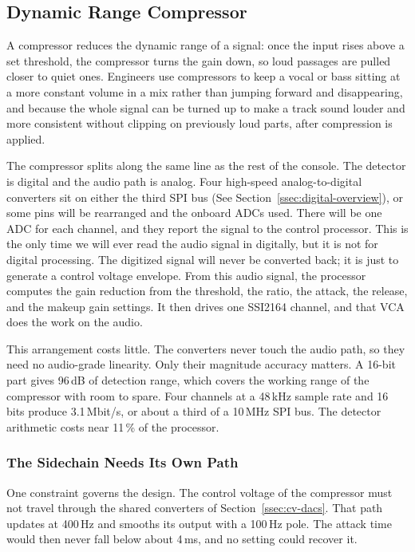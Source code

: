 \documentclass[11pt, letterpaper,titlepage]{article}
\begin{document}
\subsection{Dynamic Range Compressor}
\label{ssec:compressor}

A compressor reduces the dynamic range of a signal: once the input rises above a set threshold, the compressor turns the gain down, so loud passages are pulled closer to quiet ones. Engineers use compressors to keep a vocal or bass sitting at a more constant volume in a mix rather than jumping forward and disappearing, and because the whole signal can be turned up to make a track sound louder and more consistent without clipping on previously loud parts, after compression is applied.

The compressor splits along the same line as the rest of the console. The
detector is digital and the audio path is analog. Four high-speed
analog-to-digital converters sit on either the third SPI bus (See Section~\ref{ssec:digital-overview}), or some pins will be rearranged and the onboard ADCs used. There will be one ADC for each channel, and
they report the signal to the control processor. This is the only time we will ever read the audio signal in digitally, but it is not for digital processing. The digitized signal will never be converted back; it is just to generate a control voltage envelope. From this audio signal, the processor computes the
gain reduction from the threshold, the ratio, the attack, the release, and the
makeup gain settings. It then drives one SSI2164 channel, and that VCA does the work on
the audio.

This arrangement costs little. The converters never touch the audio path, so
they need no audio-grade linearity. Only their magnitude accuracy matters. A
16-bit part gives 96\,dB of detection range, which covers the working range of
the compressor with room to spare. Four channels at a 48\,kHz sample rate and 16
bits produce 3.1\,Mbit/s, or about a third of a 10\,MHz SPI bus. The detector
arithmetic costs near 11\,\% of the processor.

\subsubsection*{The Sidechain Needs Its Own Path}
\label{sssec:comp-latency}

One constraint governs the design. The control voltage of the compressor must
not travel through the shared converters of Section~\ref{ssec:cv-dacs}. That
path updates at 400\,Hz and smooths its output with a 100\,Hz pole. The attack
time would then never fall below about 4\,ms, and no setting could recover it.
\end{document}
